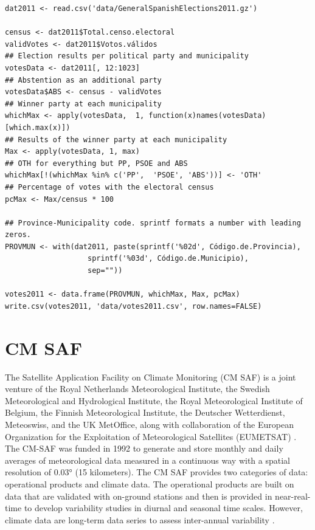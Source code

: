 \documentclass[smallroyalvopaper]{memoir}
\begin{document}

\lstset{language=R,numbers=none}
\begin{lstlisting}
dat2011 <- read.csv('data/GeneralSpanishElections2011.gz')

census <- dat2011$Total.censo.electoral
validVotes <- dat2011$Votos.válidos
## Election results per political party and municipality
votesData <- dat2011[, 12:1023]
## Abstention as an additional party
votesData$ABS <- census - validVotes
## Winner party at each municipality
whichMax <- apply(votesData,  1, function(x)names(votesData)[which.max(x)])
## Results of the winner party at each municipality
Max <- apply(votesData, 1, max)
## OTH for everything but PP, PSOE and ABS
whichMax[!(whichMax %in% c('PP',  'PSOE', 'ABS'))] <- 'OTH'
## Percentage of votes with the electoral census
pcMax <- Max/census * 100

## Province-Municipality code. sprintf formats a number with leading zeros.
PROVMUN <- with(dat2011, paste(sprintf('%02d', Código.de.Provincia),
			       sprintf('%03d', Código.de.Municipio),
			       sep=""))

votes2011 <- data.frame(PROVMUN, whichMax, Max, pcMax)
write.csv(votes2011, 'data/votes2011.csv', row.names=FALSE)
\end{lstlisting}

\section{CM SAF}
\label{sec-3}
\label{sec:CMSAF}

The Satellite Application Facility on Climate Monitoring (CM SAF) is a
joint venture of the Royal Netherlands Meteorological Institute, the
Swedish Meteorological and Hydrological Institute, the Royal
Meteorological Institute of Belgium, the Finnish Meteorological
Institute, the Deutscher Wetterdienst, Meteoswiss, and the UK
MetOffice, along with collaboration of the European Organization for
the Exploitation of Meteorological Satellites (EUMETSAT)
\cite{CMSAF}. The CM-SAF was funded in 1992 to generate and store
monthly and daily averages of meteorological data measured in a
continuous way with a spatial resolution of $\ang{0.03}$ (15
kilometers). The CM SAF provides two categories of data: operational
products and climate data. The operational products are built on data
that are validated with on-ground stations and then is provided in
near-real-time to develop variability studies in diurnal and seasonal
time scales. However, climate data are long-term data series to assess
inter-annual variability \cite{Posselt.Mueller.ea2012}.
\end{document}
